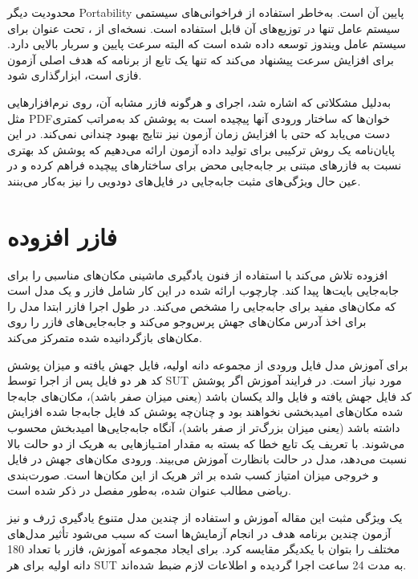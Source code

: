 محدودیت دیگر  \gls{Portability} پایین آن است.  به‌خاطر استفاده از فراخوانی‌های سیستمی سیستم‌ عامل  تنها در توزیع‌های آن قابل استفاده است. نسخه‌‌ای از ، تحت عنوان
برای سیستم عامل ویندوز توسعه داده شده است که البته سرعت پایین و سربار بالایی دارد.  برای افزایش سرعت پیشنهاد می‌کند که تنها یک تابع از برنامه که هدف اصلی آزمون فازی است، ابزارگذاری شود.

به‌دلیل مشکلاتی که اشاره شد، اجرای  و هرگونه فازر مشابه آن، روی نرم‌افزارهایی مثل \gls{PDF}خوان‌ها که ساختار ورودی آنها پیچیده است به پوشش کد به‌مراتب کمتری دست می‌یابد که حتی با افزایش زمان آزمون نیز نتایج بهبود چندانی نمی‌کند. در این پایان‌نامه یک روش ترکیبی برای تولید داده آزمون ارائه می‌دهیم که پوشش کد بهتری نسبت به فازرهای مبتنی بر جابه‌جایی محض برای ساختارهای پیچیده فراهم کرده و در عین حال ویژگی‌های مثبت جابه‌جایی در فایل‌های دودویی را نیز به‌کار می‌بنند.



\section{فازر افزوده}\label{sec:augmented-afl}
 افزوده \cite{DBLP:journals/corr/abs-1711-04596} 
تلاش می‌کند با استفاده از فنون یادگیری ماشینی مکان‌های مناسبی را برای جابه‌جایی بایت‌ها پیدا کند. چارچوب ارائه شده در این کار شامل فازر  و یک  مدل است که مکان‌های مفید برای جابه‌جایی را مشخص می‌کند. در طول اجرا فازر ابتدا مدل را برای اخذ آدرس مکان‌های جهش پرس‌وجو می‌کند و جابه‌جایی‌های فازر را روی مکان‌های بازگردانیده شده متمرکز می‌کند.

برای آموزش مدل فایل ورودی از مجموعه دانه اولیه، فایل جهش یافته و میزان پوشش کد هر دو فایل پس از اجرا توسط \gls{SUT} مورد نیاز است. در فرایند آموزش اگر پوشش کد فایل جهش یافته و فایل والد یکسان باشد (یعنی میزان  صفر باشد)، مکان‌های جابه‌جا شده مکان‌های امیدبخشی نخواهند بود و چنان‌چه پوشش کد فایل جابه‌جا شده افزایش داشته باشد (یعنی میزان  بزرگ‌تر از صفر باشد)، آنگاه جابه‌جایی‌ها امیدبخش محسوب می‌شوند. با تعریف یک تابع خطا که بسته به مقدار  امتـیاز‌هایی به هریک از دو حالت بالا نسبت می‌دهد، مدل در حالت بانظارت آموزش می‌بیند. ورودی مکان‌های جهش در فایل و خروجی میزان امتیاز کسب شده بر اثر هریک از این‌ مکان‌ها است. صورت‌بندی ریاضی مطالب عنوان شده، به‌طور مفصل در \cite{DBLP:journals/corr/abs-1711-04596} ذکر شده است.

 یک ویژگی مثبت این مقاله آموزش و استفاده از چندین مدل متنوع یادگیری ژرف و نیز آزمون چندین برنامه هدف در انجام آزمایش‌ها است که سبب می‌شود تأثیر مدل‌های مختلف را بتوان با یکدیگر مقایسه کرد. برای ایجاد مجموعه آموزش، فازر  با تعداد 180 دانه اولیه برای هر \gls{SUT} به مدت 24 ساعت اجرا گردیده و اطلاعات لازم ضبط شده‌اند.
 
